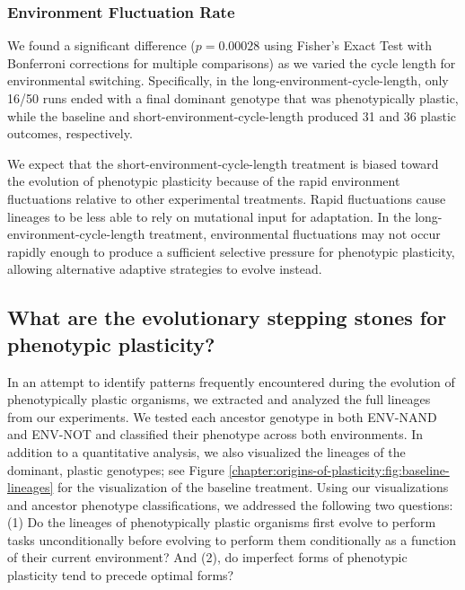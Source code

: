 



\subsubsection{Environment Fluctuation Rate}

We found a significant difference ($p = 0.00028$ using Fisher's Exact Test with Bonferroni corrections for multiple comparisons) as we varied the cycle length for environmental switching.  
Specifically, in the long-environment-cycle-length, only 16/50 runs ended with a final dominant genotype that was phenotypically plastic, while the baseline and short-environment-cycle-length produced 31 and 36 plastic outcomes, respectively.

We expect that the short-environment-cycle-length treatment is biased toward the evolution of phenotypic plasticity because of the rapid environment fluctuations relative to other experimental treatments. 
Rapid fluctuations cause lineages to be less able to rely on mutational input for adaptation. 
In the long-environment-cycle-length treatment, environmental fluctuations may not occur rapidly enough to produce a sufficient selective pressure for phenotypic plasticity, allowing alternative adaptive strategies to evolve instead.

\subsection{What are the evolutionary stepping stones for phenotypic plasticity?}

In an attempt to identify patterns frequently encountered during the evolution of phenotypically plastic organisms, we extracted and analyzed the full lineages from our experiments. 
We tested each ancestor genotype in both ENV-NAND and ENV-NOT and classified their phenotype across both environments. 
In addition to a quantitative analysis, we also visualized the lineages of the dominant, plastic genotypes; see Figure \ref{chapter:origins-of-plasticity:fig:baseline-lineages} for the visualization of the baseline treatment. 
Using our visualizations and ancestor phenotype classifications, we addressed the following two questions: 
(1) Do the lineages of phenotypically plastic organisms first evolve to perform tasks unconditionally before evolving to perform them conditionally as a function of their current environment? 
And (2), do imperfect forms of phenotypic plasticity tend to precede optimal forms?

